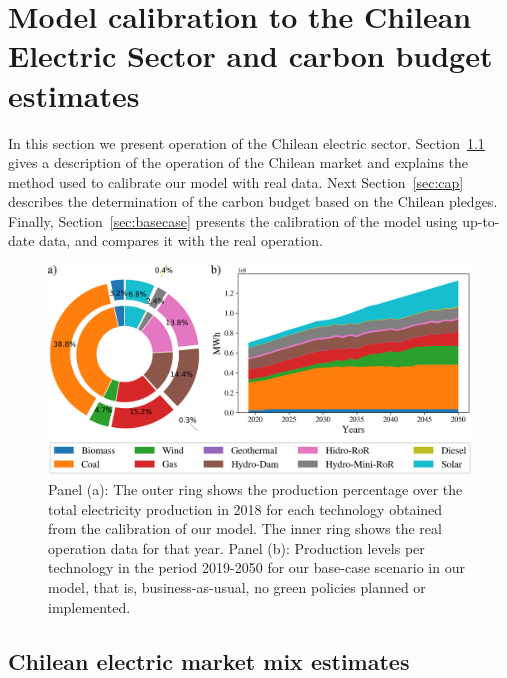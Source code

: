 \documentclass[11pt, letterpaper]{article}
\begin{document}
\section{Model calibration to the Chilean Electric Sector and carbon budget estimates}

In this section we present operation of the Chilean electric sector. Section~\ref{sec:chiledata} gives a description of the operation of the Chilean market and explains the method used to calibrate our model with real data. Next Section~\ref{sec:cap} describes the determination of the carbon budget based on the Chilean pledges. Finally, Section~\ref{sec:basecase} presents the calibration of the model using up-to-date data, and compares it with the real operation.



\begin{figure}[ht!]
 \includegraphics[width=\textwidth]{Figures/Figure1_comp.png}
 \caption{\color{red}Panel (a): The outer ring shows the production percentage over the total electricity production in 2018 for each technology  obtained from the calibration of our model. The inner ring shows the real operation data for that year. Panel (b): Production levels per technology in the period 2019-2050 for our base-case scenario in our model, that is, business-as-usual, no green policies planned or implemented. }
  \label{fig:bc}
  \end{figure}


\subsection{Chilean electric market mix estimates}\label{sec:chiledata}
\end{document}
